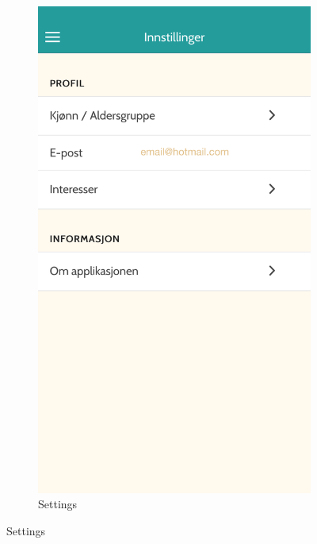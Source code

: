 \begin{appendices}
\begin{figure}[h]
\begin{subfigure}[h]{0.3\textwidth}
			\includegraphics[width=\textwidth]{fig/screenshot_settings}
			\caption{Settings}
		\end{subfigure}
	\end{figure}

\end{appendices}
\cleardoublepage